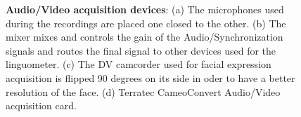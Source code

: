 \begin{figure}
	\centering
		\hspace{0.05\textwidth}

		\hspace{0.05\textwidth}

	\caption[Audio/Video acquisition devices]{\textbf{Audio/Video acquisition devices}:
	(a) The microphones used during the recordings are placed one closed to the
	other. (b) The mixer mixes and controls the gain of the
	Audio/Synchronization signals and routes the final signal to other devices
	used for the linguometer.
	(c) The DV camcorder used for facial
	expression acquisition is flipped 90 degrees on	its side in oder to have a
	better resolution of the face.
	(d) Terratec CameoConvert Audio/Video acquisition card.}
	\label{fig:linguometer:av:intro}
\end{figure}
